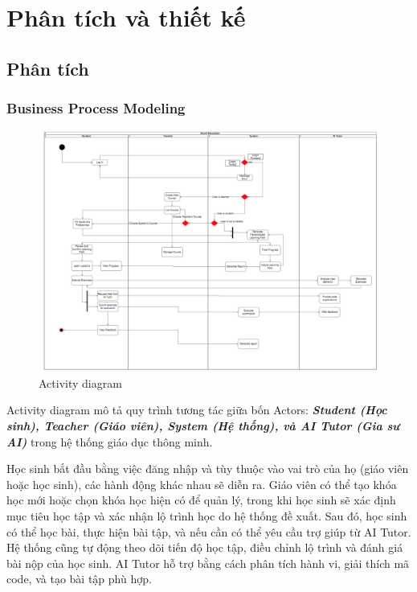 \chapter{Phân tích và thiết kế}
\section{Phân tích}
\subsection{Business Process Modeling}
\begin{figure}[H]
    \centering
    \includegraphics[width=\linewidth]{Images/Anh/activity.png}
    \caption{Activity diagram}
    \label{fig:enter-label}
\end{figure}
Activity diagram mô tả quy trình tương tác giữa bốn Actors: \textbf{\textit{Student (Học sinh), Teacher (Giáo viên), System (Hệ thống), và AI Tutor (Gia sư AI)}} trong hệ thống giáo dục thông minh. \par Học sinh bắt đầu bằng việc đăng nhập và tùy thuộc vào vai trò của họ (giáo viên hoặc học sinh), các hành động khác nhau sẽ diễn ra. Giáo viên có thể tạo khóa học mới hoặc chọn khóa học hiện có để quản lý, trong khi học sinh sẽ xác định mục tiêu học tập và xác nhận lộ trình học do hệ thống đề xuất. Sau đó, học sinh có thể học bài, thực hiện bài tập, và nếu cần có thể yêu cầu trợ giúp từ AI Tutor. Hệ thống cũng tự động theo dõi tiến độ học tập, điều chỉnh lộ trình và đánh giá bài nộp của học sinh. AI Tutor hỗ trợ bằng cách phân tích hành vi, giải thích mã code, và tạo bài tập phù hợp.

